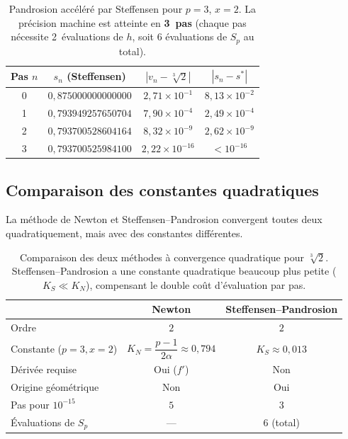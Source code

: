 \documentclass[11pt,a4paper]{article}
\theoremstyle{definition}
\newcommand{\cbrt}[1]{\sqrt[3]{#1}}
\begin{document}
\begin{table}[h]
\centering
\begin{tabular}{cccc}
\toprule
Pas $n$ & $s_n$ (Steffensen) & $|v_n - \cbrt{2}|$ & $|s_n - s^*|$ \\
\midrule
0 & $0{,}875000000000000$ & $2{,}71 \times 10^{-1}$ & $8{,}13 \times 10^{-2}$ \\
1 & $0{,}793949257650704$ & $7{,}90 \times 10^{-4}$ & $2{,}49 \times 10^{-4}$ \\
2 & $0{,}793700528604164$ & $8{,}32 \times 10^{-9}$ & $2{,}62 \times 10^{-9}$ \\
3 & $0{,}793700525984100$ & $2{,}22 \times 10^{-16}$ & $< 10^{-16}$ \\
\bottomrule
\end{tabular}
\caption{Pandrosion accéléré par Steffensen pour $p=3$, $x=2$. La précision machine est atteinte en \textbf{3~pas} (chaque pas nécessite 2~évaluations de $h$, soit 6 évaluations de $S_p$ au total).}
\end{table}

\subsection{Comparaison des constantes quadratiques}

La méthode de Newton et Steffensen--Pandrosion convergent toutes deux quadratiquement, mais avec des constantes différentes.

\begin{table}[h]
\centering
\renewcommand{\arraystretch}{1.3}
\begin{tabular}{lcc}
\toprule
& \textbf{Newton} & \textbf{Steffensen--Pandrosion} \\
\midrule
Ordre & $2$ & $2$ \\
Constante ($p\!=\!3, x\!=\!2$) & $K_N = \dfrac{p-1}{2\alpha} \approx 0{,}794$ & $K_S \approx 0{,}013$ \\
Dérivée requise & Oui ($f'$) & Non \\
Origine géométrique & Non & Oui \\
Pas pour $10^{-15}$ & $5$ & $3$ \\
Évaluations de $S_p$ & --- & $6$ (total) \\
\bottomrule
\end{tabular}
\caption{Comparaison des deux méthodes à convergence quadratique pour $\cbrt{2}$. Steffensen--Pandrosion a une constante quadratique beaucoup plus petite ($K_S \ll K_N$), compensant le double coût d'évaluation par pas.}
\end{table}
\end{document}
